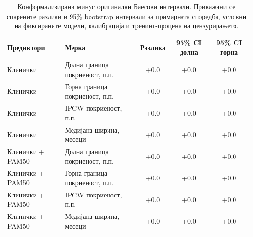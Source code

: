 \documentclass[12pt]{article}
\begin{document}
\begin{table}[htbp]
\centering
\small
\setlength{\tabcolsep}{3pt}
\caption{Конформализирани минус оригинални Баесови интервали. Прикажани се спарените разлики и 95\% bootstrap интервали за примарната споредба, условни на фиксираните модели, калибрација и тренинг-процена на цензурирањето.}
\label{tab:bayesian-conformal-primary-differences}
\begin{tabular}{@{}ll S[table-format=+3.1] S[table-format=+3.1] S[table-format=+3.1]@{}}
\toprule
Предиктори & Мерка & {Разлика} & {95\% CI долна} & {95\% CI горна} \\
\midrule
Клинички & Долна граница покриеност, п.п. & +0.0 & +0.0 & +0.0 \\
Клинички & Горна граница покриеност, п.п. & +0.0 & +0.0 & +0.0 \\
Клинички & IPCW покриеност, п.п. & +0.0 & +0.0 & +0.0 \\
Клинички & Медијана ширина, месеци & +0.0 & +0.0 & +0.0 \\
Клинички + PAM50 & Долна граница покриеност, п.п. & +0.0 & +0.0 & +0.0 \\
Клинички + PAM50 & Горна граница покриеност, п.п. & +0.0 & +0.0 & +0.0 \\
Клинички + PAM50 & IPCW покриеност, п.п. & +0.0 & +0.0 & +0.0 \\
Клинички + PAM50 & Медијана ширина, месеци & +0.0 & +0.0 & +0.0 \\
\bottomrule
\end{tabular}
\end{table}
\end{document}
